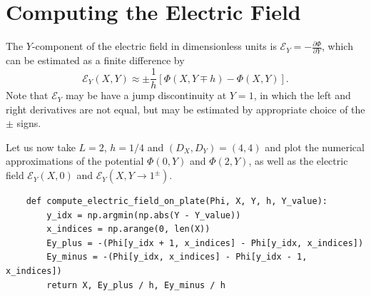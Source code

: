 \documentclass{article}
\newcommand{\pder}[2][]{\frac{\partial#1}{\partial#2}}
\begin{document}
\section{Computing the Electric Field}

The \(Y\)-component of the electric field in dimensionless units is \(\mathcal{E}_Y = -\pder[\Phi]{Y}\), which can be estimated as a finite difference by
\[ \mathcal{E}_Y(X, Y) \approx \pm\frac{1}{h} [\Phi(X, Y\mp h) - \Phi(X,Y)]. \]
Note that \(\mathcal{E}_Y\) may be have a jump discontinuity at \(Y = 1\), in which the left and right derivatives are not equal, but may be estimated by appropriate choice of the \(\pm\) signs.

Let us now take \(L = 2\), \(h = 1/4\) and \((D_X, D_Y) = (4, 4)\) and plot the numerical approximations of the potential \(\Phi(0, Y)\) and \(\Phi(2, Y)\), as well as the electric field \(\mathcal{E}_Y(X, 0)\) and \(\mathcal{E}_Y(X, Y \to 1^{\pm})\).

\begin{verbatim}
    def compute_electric_field_on_plate(Phi, X, Y, h, Y_value):
        y_idx = np.argmin(np.abs(Y - Y_value))
        x_indices = np.arange(0, len(X))
        Ey_plus = -(Phi[y_idx + 1, x_indices] - Phi[y_idx, x_indices])
        Ey_minus = -(Phi[y_idx, x_indices] - Phi[y_idx - 1, x_indices])
        return X, Ey_plus / h, Ey_minus / h
\end{verbatim}
\end{document}
